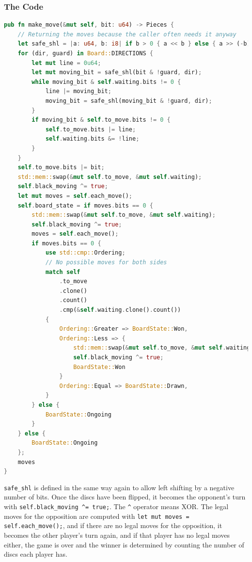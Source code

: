 \documentclass[12pt, a4paper]{report}
\begin{document}
\subsubsection{The Code}
\begin{lstlisting}[language=Rust]
pub fn make_move(&mut self, bit: u64) -> Pieces {
    // Returning the moves because the caller often needs it anyway
    let safe_shl = |a: u64, b: i8| if b > 0 { a << b } else { a >> (-b) };
    for (dir, guard) in Board::DIRECTIONS {
        let mut line = 0u64;
        let mut moving_bit = safe_shl(bit & !guard, dir);
        while moving_bit & self.waiting.bits != 0 {
            line |= moving_bit;
            moving_bit = safe_shl(moving_bit & !guard, dir);
        }
        if moving_bit & self.to_move.bits != 0 {
            self.to_move.bits |= line;
            self.waiting.bits &= !line;
        }
    }
    self.to_move.bits |= bit;
    std::mem::swap(&mut self.to_move, &mut self.waiting);
    self.black_moving ^= true;
    let mut moves = self.each_move();
    self.board_state = if moves.bits == 0 {
        std::mem::swap(&mut self.to_move, &mut self.waiting);
        self.black_moving ^= true;
        moves = self.each_move();
        if moves.bits == 0 {
            use std::cmp::Ordering;
            // No possible moves for both sides
            match self
                .to_move
                .clone()
                .count()
                .cmp(&self.waiting.clone().count())
            {
                Ordering::Greater => BoardState::Won,
                Ordering::Less => {
                    std::mem::swap(&mut self.to_move, &mut self.waiting);
                    self.black_moving ^= true;
                    BoardState::Won
                }
                Ordering::Equal => BoardState::Drawn,
            }
        } else {
            BoardState::Ongoing
        }
    } else {
        BoardState::Ongoing
    };
    moves
}
\end{lstlisting}

\texttt{safe\_shl} is defined in the same way again to allow left shifting by a negative number of bits. Once the discs have been flipped, it becomes the opponent's turn with \texttt{self.black\_moving \^{}= true;}. 
The \texttt{\^{}} operator means XOR. The legal moves for the opposition are computed with \texttt{let mut moves = self.each\_move();}, and if there are no legal moves for the opposition, it becomes the other player's turn again, 
and if that player has no legal moves either, the game is over and the winner is determined by counting the number of discs each player has.
\end{document}
